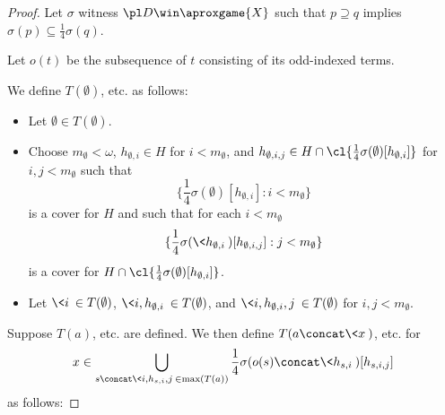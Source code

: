 \begin{proof}
  Let $\sigma$ witness $\pl D \win \aproxgame{X}$ such that $p\supseteq q$ implies $\sigma(p)\subseteq \frac{1}{4}\sigma(q)$.

  Let $o(t)$ be the subsequence of $t$ consisting of its odd-indexed terms.

  We define $T(\emptyset)$, etc. as follows:

  \begin{itemize}
    \item Let $\emptyset\in T(\emptyset)$.
    \item Choose $m_\emptyset<\omega$, $h_{\emptyset,i}\in H$ for $i<m_\emptyset$, and $h_{\emptyset,i,j}\in H\cap\cl{\frac{1}{4}\sigma(\emptyset)[h_{\emptyset,i}]}$ for $i,j<m_\emptyset$ such that
      \[
        \{\frac{1}{4}\sigma(\emptyset)[h_{\emptyset,i}]:i<m_\emptyset\}
      \]
    is a cover for $H$ and such that for each $i<m_\emptyset$
      \[
        \{\frac{1}{4}\sigma(\<h_{\emptyset,i}\>)[h_{\emptyset,i,j}]:j<m_\emptyset\}
      \]
    is a cover for $H\cap\cl{\frac{1}{4}\sigma(\emptyset)[h_{\emptyset,i}]}$.
    \item Let $\<i\>\in T(\emptyset)$, $\<i,h_{\emptyset,i}\>\in T(\emptyset)$, and $\<i,h_{\emptyset,i},j\>\in T(\emptyset)$ for $i,j<m_\emptyset$.
  \end{itemize}

  Suppose $T(a)$, etc. are defined. We then define $T(a\concat\<x\>)$, etc. for
    \[
      x\in \bigcup_{s\concat\<i,h_{s,i},j\>\in\max(T(a))} \frac{1}{4}\sigma(o(s)\concat\<h_{s,i}\>)[h_{s,i,j}]
    \]
  as follows:


\end{proof}
